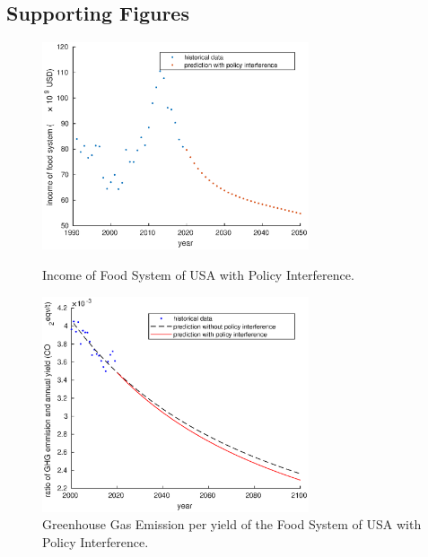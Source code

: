 \documentclass[12pt]{article}
\begin{document}
\begin{appendices}
\section{Supporting Figures}
\begin{figure}[htbp]
    \centering
    \begin{minipage}[t]{0.48\textwidth}
        \centering
        \includegraphics[width=0.7\textwidth]{figure/model/USA/USA_profit.eps}
        \caption{Income of Food System of USA with Policy Interference.}
    \end{minipage}
    \begin{minipage}[t]{0.48\textwidth}
        \centering
        \includegraphics[width=0.7\textwidth]{figure/model/USA/USA_sustainability.eps}
        \caption{Greenhouse Gas Emission per yield of the Food System of USA with Policy Interference.}
    \end{minipage}
\end{figure}
\begin{figure}[htbp]
    \centering
    \begin{minipage}[t]{0.48\textwidth}

\end{minipage}
\end{figure}
\end{appendices}
\end{document}
